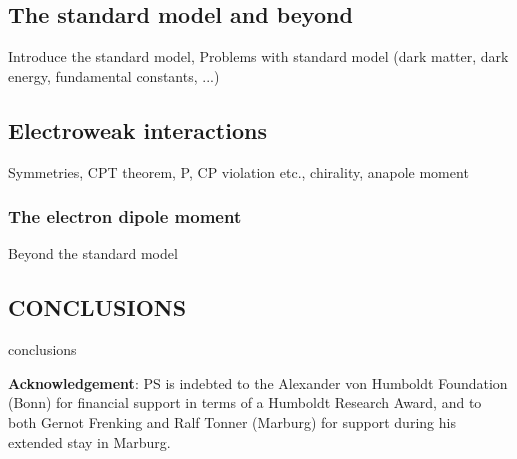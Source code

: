 \documentclass[12pt]{article}
\begin{document}
\subsection{\sffamily The standard model and beyond}
Introduce the standard model, Problems with standard model (dark matter, dark energy, fundamental constants, ...)

\subsection{\sffamily Electroweak interactions}
Symmetries, CPT theorem, P, CP violation etc., chirality, anapole moment

\subsubsection{\sffamily The electron dipole moment}
Beyond the standard model

\subsection{\sffamily \large CONCLUSIONS}
conclusions

{\footnotesize
{\bf Acknowledgement}: PS is indebted to the Alexander von Humboldt Foundation (Bonn) for financial support 
in terms of a Humboldt Research Award, and to both Gernot Frenking and 
Ralf Tonner (Marburg) for support during his extended stay in Marburg.}



\end{document}

